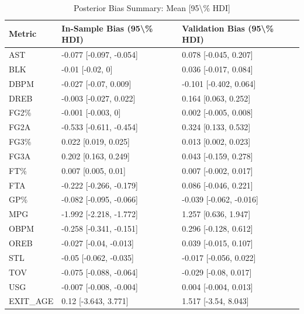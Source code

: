 \begin{table}[t]
\caption*{
{\fontsize{20}{25}\selectfont  Posterior Bias Summary: Mean [95\textbackslash{}\% HDI]\fontsize{12}{15}\selectfont }
} 
\fontsize{12.0pt}{14.0pt}\selectfont
\begin{tabular*}{\linewidth}{@{\extracolsep{\fill}}lll}
\toprule
Metric & In-Sample Bias (95\textbackslash{}\% HDI) & Validation Bias (95\textbackslash{}\% HDI) \\ 
\midrule\addlinespace[2.5pt]
AST & -0.077 [-0.097, -0.054] & 0.078 [-0.045, 0.207] \\ 
BLK & -0.01 [-0.02, 0] & 0.036 [-0.017, 0.084] \\ 
DBPM & -0.027 [-0.07, 0.009] & -0.101 [-0.402, 0.064] \\ 
DREB & -0.003 [-0.027, 0.022] & 0.164 [0.063, 0.252] \\ 
FG2\% & -0.001 [-0.003, 0] & 0.002 [-0.005, 0.008] \\ 
FG2A & -0.533 [-0.611, -0.454] & 0.324 [0.133, 0.532] \\ 
FG3\% & 0.022 [0.019, 0.025] & 0.013 [0.002, 0.023] \\ 
FG3A & 0.202 [0.163, 0.249] & 0.043 [-0.159, 0.278] \\ 
FT\% & 0.007 [0.005, 0.01] & 0.007 [-0.002, 0.017] \\ 
FTA & -0.222 [-0.266, -0.179] & 0.086 [-0.046, 0.221] \\ 
GP\% & -0.082 [-0.095, -0.066] & -0.039 [-0.062, -0.016] \\ 
MPG & -1.992 [-2.218, -1.772] & 1.257 [0.636, 1.947] \\ 
OBPM & -0.258 [-0.341, -0.151] & 0.296 [-0.128, 0.612] \\ 
OREB & -0.027 [-0.04, -0.013] & 0.039 [-0.015, 0.107] \\ 
STL & -0.05 [-0.062, -0.035] & -0.017 [-0.056, 0.022] \\ 
TOV & -0.075 [-0.088, -0.064] & -0.029 [-0.08, 0.017] \\ 
USG & -0.007 [-0.008, -0.004] & 0.004 [-0.004, 0.013] \\ 
EXIT\_AGE & 0.12 [-3.643, 3.771] & 1.517 [-3.54, 8.043] \\ 
\bottomrule
\end{tabular*}
\end{table}

